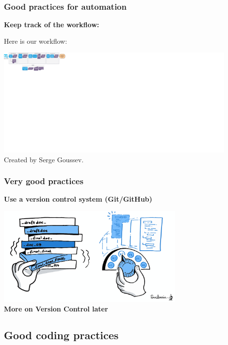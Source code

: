 \documentclass[xcolor=x11names,compress]{beamer}
\renewcommand{\(}{\begin{columns}}
\renewcommand{\)}{\end{columns}}
\newcommand{\<}[1]{\begin{column}{#1}}
\renewcommand{\>}{\end{column}}
\begin{document}
\begin{frame}
\frametitle{\textbf{Good practices for  automation} }
\textcolor{siap}{\textbf{Keep track of the workflow:} \\  }

Here is our workflow:\\
\begin{center}
\href{https://github.com/sergegoussev/ESCAP_RAP_class/blob/main/docs/images/ads-process-overview-high-level-overview.drawio.svg}
{\includegraphics[width=0.9\textwidth]{ESCAPWebScrappingPipeline.png}} \\
\hfill \tiny{ \textcolor{gris}{Created by Serge Goussev.}}
\end{center}

\end{frame}

\begin{frame}
\frametitle{\textbf{Very good practices} }
\textcolor{siap}{\textbf{Use a version control system  (Git/GitHub)}} \\
\vspace{0.5cm}
\begin{center}
 \includegraphics[width=0.7\textwidth]{FileHistory.PNG} \\

\large{\textbf{ More on Version Control later }}

\end{center}
\end{frame}

\subsection{Good coding practices}
\end{document}
